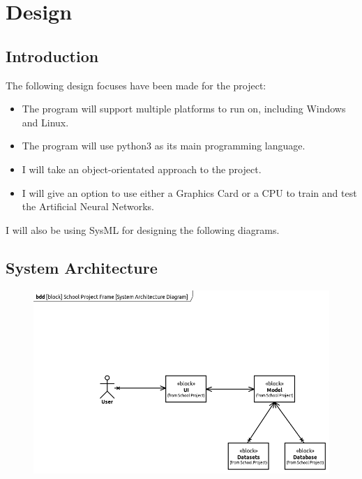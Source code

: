 \documentclass[./project-report/src/latex/project-report.tex]{subfiles}
\begin{document}
\maketitle

\clearpage
\section{Design}

\subsection{Introduction}

The following design focuses have been made for the project:

\begin{itemize}
    \item The program will support multiple platforms to run on, including Windows and Linux.
    \item The program will use python3 as its main programming language.
    \item I will take an object-orientated approach to the project.
    \item I will give an option to use either a Graphics Card or a CPU to train and test the Artificial Neural Networks.
\end{itemize}

I will also be using SysML for designing the following diagrams.

\subsection{System Architecture}

\begin{figure}[h!]
\centering
\includegraphics[width=1\textwidth]{./project-report/src/images/system-architecture-diagram.png}
\end{figure}
\end{document}
